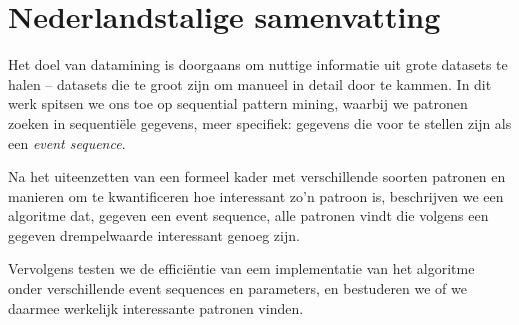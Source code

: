 \chapter{Nederlandstalige samenvatting}

Het doel van datamining is doorgaans om nuttige informatie uit grote datasets te halen -- datasets die te groot zijn om manueel in detail door te kammen. In dit werk spitsen we ons toe op sequential pattern mining, waarbij we patronen zoeken in sequentiële gegevens, meer specifiek: gegevens die voor te stellen zijn als een \emph{event sequence}.

Na het uiteenzetten van een formeel kader met verschillende soorten patronen en manieren om te kwantificeren hoe interessant zo'n patroon is, beschrijven we een algoritme dat, gegeven een event sequence, alle patronen vindt die volgens een gegeven drempelwaarde interessant genoeg zijn.

Vervolgens testen we de efficiëntie van eem implementatie van het algoritme onder verschillende event sequences en parameters, en bestuderen we of we daarmee werkelijk interessante patronen vinden.
